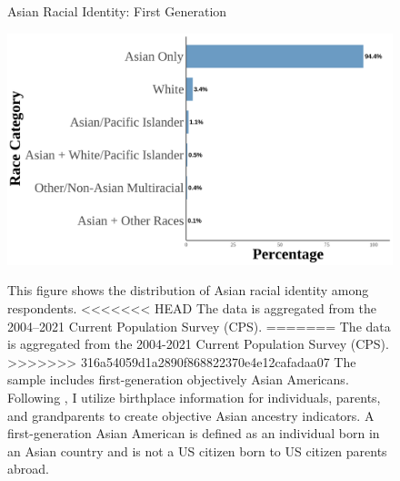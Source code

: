 \begin{center}
\begin{figure}[H]
\caption{Asian Racial Identity: First Generation}
\includegraphics[width=\textwidth]{histogram_asian_american_race_firstgen.png} 
\label{fig:histogram-firstgen}
\caption*{\footnotesize{This figure shows the distribution of Asian racial identity among respondents. 
<<<<<<< HEAD
The data is aggregated from the 2004--2021 Current Population Survey (CPS). 
=======
The data is aggregated from the 2004-2021 Current Population Survey (CPS). 
>>>>>>> 316a54059d1a2890f868822370e4e12cafadaa07
The sample includes first-generation objectively Asian Americans.
Following \textcite{antmanEthnicAttritionObserved2016,antmanEthnicAttritionAssimilation2020}, 
I utilize birthplace information for individuals, parents, and grandparents to create objective Asian ancestry indicators.
A first-generation Asian American is defined as an individual born in an Asian country and is not a US citizen born to US citizen parents abroad.
}}
\end{figure}
\end{center}


\pagebreak
\newpage


